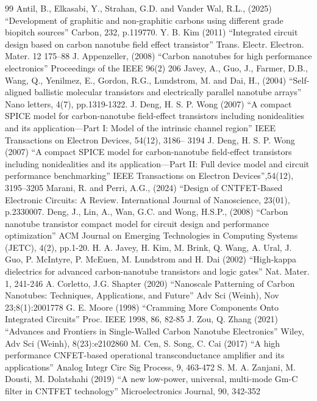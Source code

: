 \begin{thebibliography}{99}
   Antil, B., Elkasabi, Y., Strahan, G.D. and Vander Wal, R.L., (2025) “Development of graphitic and non-graphitic carbons using different grade biopitch sources” Carbon, 232, p.119770.
   Y. B. Kim (2011) “Integrated circuit design based on carbon nanotube field effect transistor” Trans. Electr. Electron. Mater. 12 175–88
   J. Appenzeller, (2008) “Carbon nanotubes for high performance electronics” Proceedings of the IEEE 96(2) 206
   Javey, A., Guo, J., Farmer, D.B., Wang, Q., Yenilmez, E., Gordon, R.G., Lundstrom, M. and Dai, H., (2004) “Self-aligned ballistic molecular transistors and electrically parallel nanotube arrays” Nano letters, 4(7), pp.1319-1322.
   J. Deng, H. S. P. Wong (2007) “A compact SPICE model for carbon-nanotube field-effect transistors including nonidealities and its application—Part I: Model of the intrinsic channel region” IEEE Transactions on Electron Devices, 54(12), 3186– 3194
   J. Deng, H. S. P. Wong (2007) “A compact SPICE model for carbon-nanotube field-effect transistors including nonidealities and its application—Part II: Full device model and circuit performance benchmarking” IEEE Transactions on Electron Devices”,54(12), 3195–3205
   Marani, R. and Perri, A.G., (2024) “Design of CNTFET-Based Electronic Circuits: A Review. International Journal of Nanoscience, 23(01), p.2330007.
   Deng, J., Lin, A., Wan, G.C. and Wong, H.S.P., (2008) “Carbon nanotube transistor compact model for circuit design and performance optimization” ACM Journal on Emerging Technologies in Computing Systems (JETC), 4(2), pp.1-20.
   H. A. Javey, H. Kim, M. Brink, Q. Wang, A. Ural, J. Guo, P. McIntyre, P. McEuen, M. Lundstrom and H. Dai (2002) “High-kappa dielectrics for advanced carbon-nanotube transistors and logic gates” Nat. Mater. 1, 241-246
   A. Corletto, J.G. Shapter (2020) “Nanoscale Patterning of Carbon Nanotubes: Techniques, Applications, and Future” Adv Sci (Weinh), Nov 23;8(1):2001778
   G. E. Moore (1998) “Cramming More Components Onto Integrated Circuits” Proc. IEEE 1998, 86, 82-85
   J. Zou, Q. Zhang (2021) “Advances and Frontiers in Single-Walled Carbon Nanotube Electronics” Wiley, Adv Sci (Weinh),  8(23):e2102860
   M. Cen, S. Song, C. Cai (2017) “A high performance CNFET-based operational transconductance amplifier and its applications” Analog Integr Circ Sig Process, 9, 463-472
   S. M. A. Zanjani, M. Dousti, M. Dolatshahi (2019) “A new low-power, universal, multi-mode Gm-C filter in CNTFET technology” Microelectronics Journal, 90, 342-352

\end{thebibliography}
